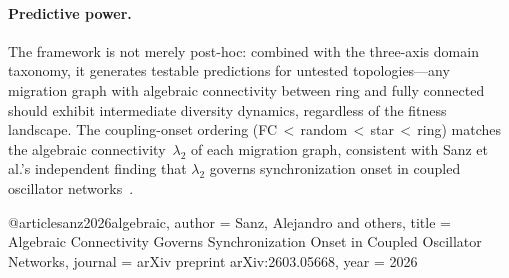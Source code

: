 
\paragraph{Predictive power.}
The framework is not merely post-hoc: combined with the three-axis domain
taxonomy, it generates testable predictions for untested topologies---any
migration graph with algebraic connectivity between ring and fully
connected should exhibit intermediate diversity dynamics, regardless of
the fitness landscape. The coupling-onset ordering
(FC\,$<$\,random\,$<$\,star\,$<$\,ring) matches the algebraic
connectivity~$\lambda_2$ of each migration graph, consistent with
Sanz et al.'s independent finding that $\lambda_2$ governs
synchronization onset in coupled oscillator
networks~\cite{sanz2026algebraic}.







@article{sanz2026algebraic,
  author  = {Sanz, Alejandro and others},
  title   = {Algebraic Connectivity Governs Synchronization Onset
             in Coupled Oscillator Networks},
  journal = {arXiv preprint arXiv:2603.05668},
  year    = {2026}
}


